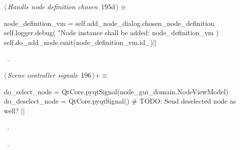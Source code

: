 \documentclass[%
    a4paper,    %
    justified,  %
    nobib,      %
    openany     %
]{tufte-book}
\makeatletter
\renewcommand{\label}[1]{\@tufte@label{##1}}%
\makeatother
\begin{document}
\begin{fullwidth}
\begin{flushleft}
\begin{minipage}{\linewidth}
\begin{list}{}{\setlength{\itemsep}{-\parsep}\setlength{\itemindent}{-\leftmargin}}
\item{}
\end{list}
\end{minipage}\vspace{4ex}
\end{flushleft}
\begin{flushleft} \small
\begin{minipage}{\linewidth}\label{scrap186}\raggedright\small
{} $\langle\,${\itshape Handle node definition chosen}\nobreak\ {\footnotesize {195d}}$\,\rangle\equiv$
\vspace{-1ex}
\begin{pythoncode}
node_definition_vm = self.add_node_dialog.chosen_node_definition
self.logger.debug(
    "Node instance shall be added: %
    node_definition_vm
)
self.do_add_node.emit(node_definition_vm.id_)|\NWsep|
\end{pythoncode}
\vspace{1.5ex}
\footnotesize
\begin{list}{}{\setlength{\itemsep}{-\parsep}\setlength{\itemindent}{-\leftmargin}}
\item \NWtxtMacroRefIn\ .

\item{}
\end{list}
\end{minipage}\vspace{4ex}
\end{flushleft}
\begin{flushleft} \small
\begin{minipage}{\linewidth}\label{scrap187}\raggedright\small
{} $\langle\,${\itshape Scene controller signals}\nobreak\ {\footnotesize {196}}$\,\rangle+\equiv$
\vspace{-1ex}
\begin{pythoncode}
do_select_node = QtCore.pyqtSignal(node_gui_domain.NodeViewModel)
do_deselect_node = QtCore.pyqtSignal()  # TODO: Send deselected node as well?
|\NWsep|
\end{pythoncode}
\vspace{1.5ex}
\footnotesize
\begin{list}{}{\setlength{\itemsep}{-\parsep}\setlength{\itemindent}{-\leftmargin}}
\item \NWtxtMacroDefBy\ .
\item \NWtxtMacroRefIn\ .


\end{list}
\end{minipage}
\end{flushleft}
\end{fullwidth}
\end{document}
